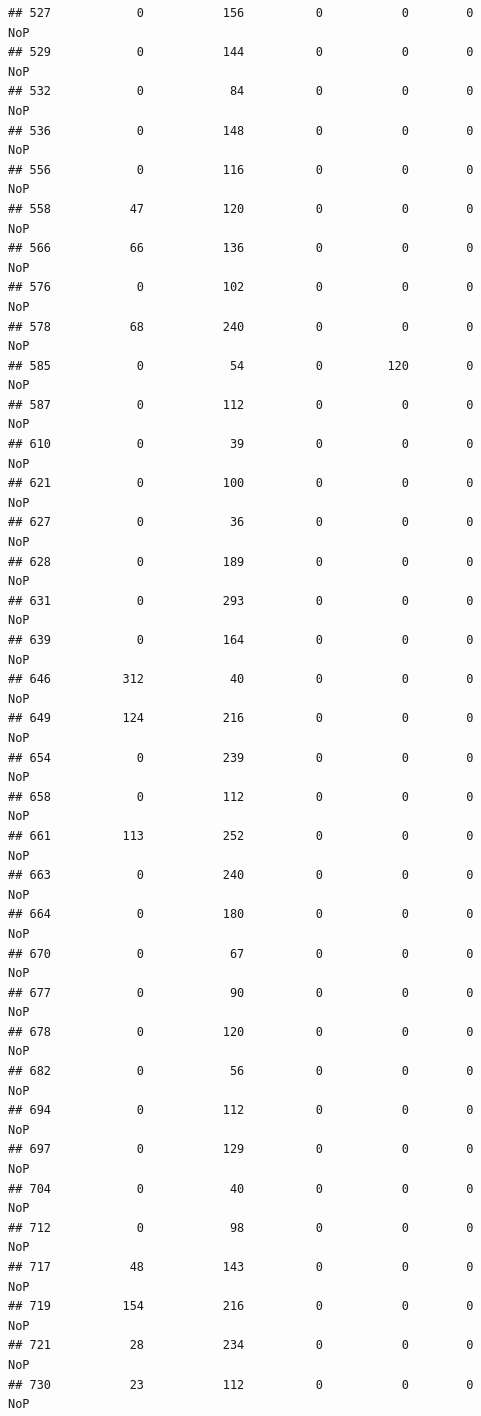 \documentclass[]{article}
\begin{document}
\begin{verbatim}
## 527            0           156          0           0        0    NoP
## 529            0           144          0           0        0    NoP
## 532            0            84          0           0        0    NoP
## 536            0           148          0           0        0    NoP
## 556            0           116          0           0        0    NoP
## 558           47           120          0           0        0    NoP
## 566           66           136          0           0        0    NoP
## 576            0           102          0           0        0    NoP
## 578           68           240          0           0        0    NoP
## 585            0            54          0         120        0    NoP
## 587            0           112          0           0        0    NoP
## 610            0            39          0           0        0    NoP
## 621            0           100          0           0        0    NoP
## 627            0            36          0           0        0    NoP
## 628            0           189          0           0        0    NoP
## 631            0           293          0           0        0    NoP
## 639            0           164          0           0        0    NoP
## 646          312            40          0           0        0    NoP
## 649          124           216          0           0        0    NoP
## 654            0           239          0           0        0    NoP
## 658            0           112          0           0        0    NoP
## 661          113           252          0           0        0    NoP
## 663            0           240          0           0        0    NoP
## 664            0           180          0           0        0    NoP
## 670            0            67          0           0        0    NoP
## 677            0            90          0           0        0    NoP
## 678            0           120          0           0        0    NoP
## 682            0            56          0           0        0    NoP
## 694            0           112          0           0        0    NoP
## 697            0           129          0           0        0    NoP
## 704            0            40          0           0        0    NoP
## 712            0            98          0           0        0    NoP
## 717           48           143          0           0        0    NoP
## 719          154           216          0           0        0    NoP
## 721           28           234          0           0        0    NoP
## 730           23           112          0           0        0    NoP

\end{verbatim}
\end{document}
